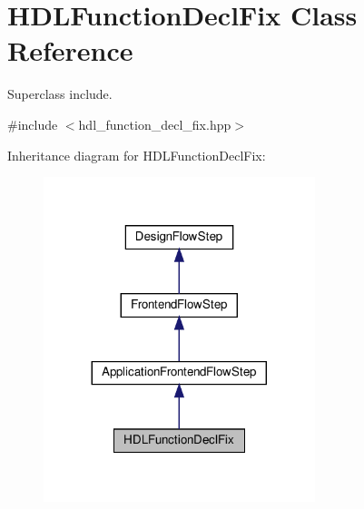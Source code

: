 \hypertarget{classHDLFunctionDeclFix}{}\section{H\+D\+L\+Function\+Decl\+Fix Class Reference}
\label{classHDLFunctionDeclFix}


Superclass include.  




{\ttfamily \#include $<$hdl\+\_\+function\+\_\+decl\+\_\+fix.\+hpp$>$}



Inheritance diagram for H\+D\+L\+Function\+Decl\+Fix\+:
\nopagebreak
\begin{figure}[H]
\begin{center}
\leavevmode
\includegraphics[width=224pt]{d2/d19/classHDLFunctionDeclFix__inherit__graph}
\end{center}
\end{figure}


